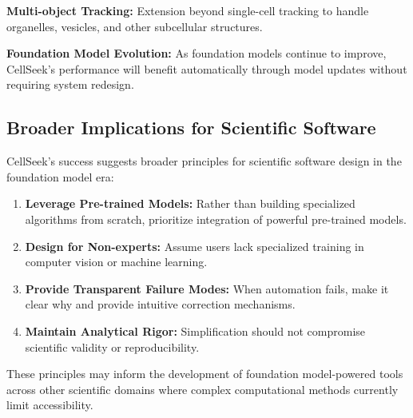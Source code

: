 \documentclass[../cellseek_paper.tex]{subfiles}
\begin{document}
\textbf{Multi-object Tracking:} Extension beyond single-cell tracking to handle organelles, vesicles, and other subcellular structures.

\textbf{Foundation Model Evolution:} As foundation models continue to improve, CellSeek's performance will benefit automatically through model updates without requiring system redesign.

\subsection{Broader Implications for Scientific Software}

CellSeek's success suggests broader principles for scientific software design in the foundation model era:

\begin{enumerate}
  \item \textbf{Leverage Pre-trained Models:} Rather than building specialized algorithms from scratch, prioritize integration of powerful pre-trained models.
  \item \textbf{Design for Non-experts:} Assume users lack specialized training in computer vision or machine learning.
  \item \textbf{Provide Transparent Failure Modes:} When automation fails, make it clear why and provide intuitive correction mechanisms.
  \item \textbf{Maintain Analytical Rigor:} Simplification should not compromise scientific validity or reproducibility.
\end{enumerate}

These principles may inform the development of foundation model-powered tools across other scientific domains where complex computational methods currently limit accessibility.
\end{document}

